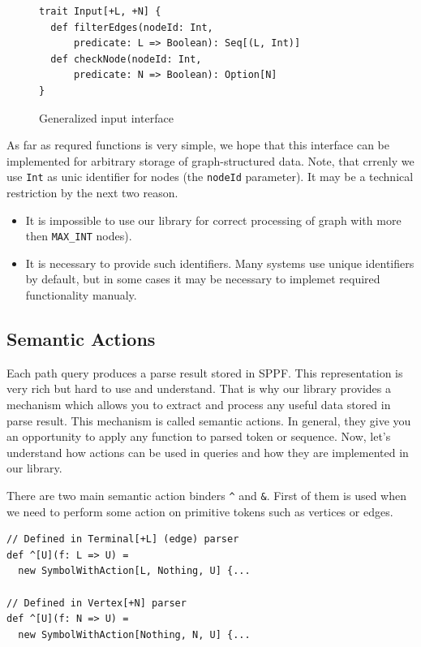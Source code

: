 \begin{figure}[h]
\begin{lstlisting}
trait Input[+L, +N] {
  def filterEdges(nodeId: Int, 
      predicate: L => Boolean): Seq[(L, Int)]
  def checkNode(nodeId: Int, 
      predicate: N => Boolean): Option[N]
}

\end{lstlisting}
\caption{Generalized input interface}
\label{fig:input}
\end{figure}

As far as requred functions is very simple, we hope that this interface can be implemented for arbitrary storage of graph-structured data.
Note, that crrenly we use \lstinline{Int} as unic identifier for nodes (the \lstinline{nodeId} parameter).
It may be a technical restriction by the next two reason.
\begin{itemize}
\item It is impossible to use our library for correct processing of graph with more then \lstinline{MAX_INT} nodes). 
\item It is necessary to provide such identifiers. Many systems use unique identifiers by default, but in some cases it may be necessary to implemet required functionality manualy.
\end{itemize}



\subsection{Semantic Actions}
\label{sec:semanticActions}
Each path query produces a parse result stored in SPPF. This representation is very rich but hard to use and understand.
That is why our library provides a mechanism which allows you to extract and process any useful data stored in parse result.
This mechanism is called semantic actions.
In general, they give you an opportunity to apply any function to parsed token or sequence.
Now, let's understand how actions can be used in queries and how they are implemented in our library.

There are two main semantic action binders \lstinline{^} and \lstinline{&}.
First of them is used when we need to perform some action on primitive tokens such as vertices or edges.
\begin{lstlisting}
// Defined in Terminal[+L] (edge) parser
def ^[U](f: L => U) = 
  new SymbolWithAction[L, Nothing, U] {...
  
// Defined in Vertex[+N] parser
def ^[U](f: N => U) = 
  new SymbolWithAction[Nothing, N, U] {...
\end{lstlisting}

